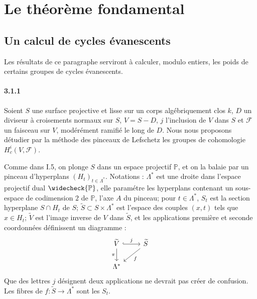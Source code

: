 \documentclass[12pt,a4paper]{article}
\theoremstyle{plain}
\theoremstyle{definition}
\theoremstyle{remark}
\newcommand{\PP}{{\mathbb{P}}}
\begin{document}
\section{Le th\'eor\`eme fondamental}

\subsection{Un calcul de cycles \'evanescents}

Les r\'esultats de ce paragraphe serviront \`a calculer, modulo entiers, les poids de certains groupes de cycles \'evanescents.

\paragraph{3.1.1}
Soient $S$ une surface projective et lisse sur un corps alg\'ebriquement clos $k$, $D$ un diviseur \`a croisements normaux sur $S$, $V = S - D$, $j$ l'inclusion de $V$ dans $S$ et $\mathscr{F}$ un faisceau sur $V$, mod\'er\'ement ramifi\'e le long de $D$. Nous nous proposons d\'etudier par la m\'ethode des pinceaux de Lefschetz les groupes de cohomologie $H_c^i(V, \mathscr{F})$.

Comme dans I.5, on plonge $S$ dans un espace projectif $\PP$, et on la balaie par un pinceau d'hyperplans $(H_t)_{t \in \Lambda^*}$. Notations : $\Lambda^*$ est une droite dans l'espace projectif dual $\widecheck{\PP}$, elle param\'etre les hyperplans contenant un sous-espace de codimension $2$ de $\PP$, l'axe $A$ du pinceau; pour $t \in \Lambda^*$, $S_t$ est la section hyperplane $S \cap H_t$ de $S$; $\widetilde{S} \subset S \times \Lambda^*$ est l'espace des couples $(x,t)$ tels que $x \in H_t$; $\widetilde{V}$ est l'image inverse de $V$ dans $\widetilde{S}$, et les applications premi\`ere et seconde coordonn\'ees d\'efinissent un diagramme :
\begin{equation}\label{eq:3.1.1.1}
\begin{tikzcd}
\widetilde{V} \arrow[r, hook, "j"] \arrow[d, "\pi"'] & \widetilde{S} \arrow[dl, "f"] \\
\Lambda^* &
\end{tikzcd}
\end{equation}
Que des lettres $j$ d\'esignent deux applications ne devrait pas cr\'eer de confusion. Les fibres de $f : \widetilde{S} \to \Lambda^*$ sont les $S_t$.
\end{document}
